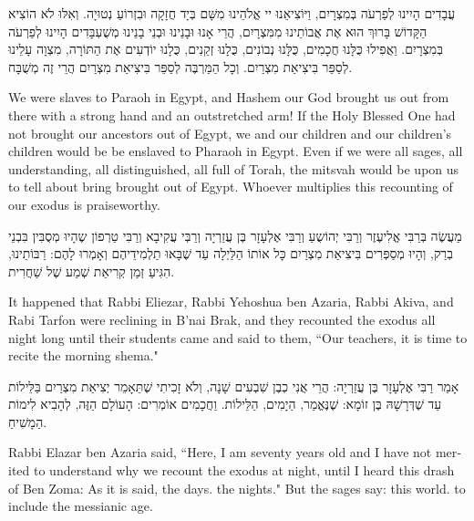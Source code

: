 עֲבָדִים הָיִינוּ לְפַרְעֹה בְּמִצְרָיִם, וַיּוֹצִיאֵנוּ יי אֱלֹהֵינוּ מִשָּׁם בְּיָד חֲזָקָה וּבִזְרוֹעַ נְטוּיָה. וְאִלּוּ לֹא הוֹצִיא הַקָּדוֹשׁ בָּרוּךְ הוּא אֶת אֲבוֹתֵינוּ מִמִּצְרָיִם, הֲרֵי אָנוּ וּבָנֵינוּ וּבְנֵי בָנֵינוּ מְשֻׁעְבָּדִים הָיִינוּ לְפַרְעֹה בְּמִצְרָיִם. וַאֲפִילוּ כֻּלָּנוּ חֲכָמִים, כֻּלָּנוּ נְבוֹנִים, כֻּלָנוּ זְקֵנִים, כֻּלָנוּ יוֹדְעִים אֶת הַתּוֹרָה, מִצְוָה עָלֵינוּ לְסַפֵּר בִּיצִיאַת מִצְרַיִם. וְכָל הַמַּרְבֶּה לְסַפֵּר בִּיצִיאַת מִצְרַיִם הֲרֵי זֶה מְשֻׁבָּח.

\begin{english}
We were slaves to Paraoh in Egypt, and Hashem our God brought us out from there with a strong hand and an outstretched arm! If the Holy Blessed One had not brought our ancestors out of Egypt, we and our children and our children's children would be be enslaved to Pharaoh in Egypt. Even if we were all sages, all understanding, all distinguished, all full of Torah, the mitsvah would be upon us to tell about bring brought out of Egypt. Whoever multiplies this recounting of our exodus is praiseworthy.
\end{english}

מַעֲשֶׂה בְּרַבִּי אֱלִיעֶזֶר וְרַבִּי יְהוֹשֻעַ וְרַבִּי אֶלְעָזָר בֶּן עֲזַרְיָה וְרַבְּי עֲקִיבָא וְרַבִּי טַרְפוֹן שֶהָיוּ מְסֻבִּין בִּבְנֵי בְרַק, וְהָיוּ מְסַפְּרִים בִּיצִיאַת מִצְרַיִם כָּל אוֹתוֹ הַלַּיְלָה עַד שֶׁבָּאוּ תַלְמִידֵיהֶם וְאָמְרוּ לָהֶם: רַבּוֹתֵינוּ, הִגִּיעַ זְמַן קְרִיאַת שְׁמַע שֶׁל שַׁחֲרִית.

\begin{english}
It happened that Rabbi Eliezar, Rabbi Yehoshua ben Azaria, Rabbi Akiva, and Rabi Tarfon were reclining in B'nai Brak, and they recounted the exodus all night long until their students came and said to them, ``Our teachers, it is time to recite the morning shema."
\end{english}

\break

אָמַר רַבִּי אֶלְעָזָר בֶּן עֲזַרְיָה: הֲרֵי אֲנִי כְבֶן שִׁבְעִים שָׁנָה, וְלֹא זָכִיתִי שֶׁתֵּאָמֵר יְצִיאַת מִצְרַיִם בַּלֵּילוֹת עַד שֶׁדְּרָשָׁהּ בֶּן זוֹמָא: שֶׁנֶּאֱמַר,
הַיָמִים,
הַלֵּילוֹת. וַחֲכָמִים אוֹמְרִים: 
הָעוֹלָם הַזֶּה, 
לְהָבִיא לִימוֹת הַמָשִׁיחַ.

\begin{english}
Rabbi Elazar ben Azaria said, ``Here, I am seventy years old and I have not merited to understand why we recount the exodus at night, until I heard this drash of Ben Zoma: As it is said,   the days.  the nights." But the sages say:  this world.  to include the messianic age.
\end{english}

